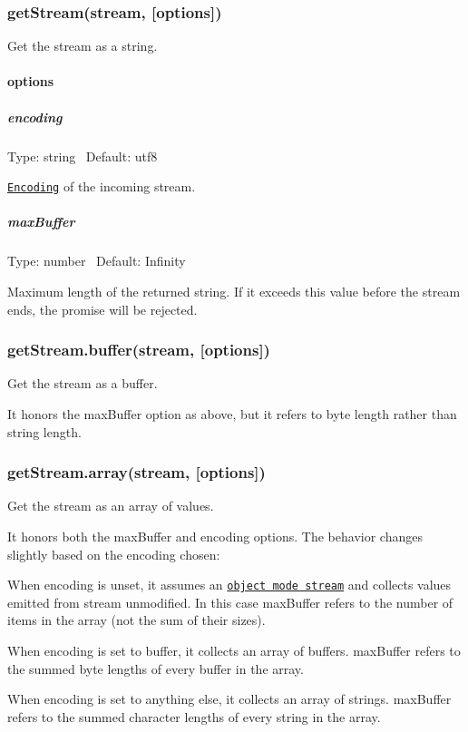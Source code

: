 \subsubsection*{get\+Stream(stream, \mbox{[}options\mbox{]})}

Get the {\ttfamily stream} as a string.

\paragraph*{options}

\subparagraph*{encoding}

Type\+: {\ttfamily string}~\newline
 Default\+: {\ttfamily utf8}

\href{https://nodejs.org/api/buffer.html#buffer_buffer}{\tt Encoding} of the incoming stream.

\subparagraph*{max\+Buffer}

Type\+: {\ttfamily number}~\newline
 Default\+: {\ttfamily Infinity}

Maximum length of the returned string. If it exceeds this value before the stream ends, the promise will be rejected.

\subsubsection*{get\+Stream.\+buffer(stream, \mbox{[}options\mbox{]})}

Get the {\ttfamily stream} as a buffer.

It honors the {\ttfamily max\+Buffer} option as above, but it refers to byte length rather than string length.

\subsubsection*{get\+Stream.\+array(stream, \mbox{[}options\mbox{]})}

Get the {\ttfamily stream} as an array of values.

It honors both the {\ttfamily max\+Buffer} and {\ttfamily encoding} options. The behavior changes slightly based on the encoding chosen\+:


\begin{DoxyItemize}
\item When {\ttfamily encoding} is unset, it assumes an \href{https://nodesource.com/blog/understanding-object-streams/}{\tt object mode stream} and collects values emitted from {\ttfamily stream} unmodified. In this case {\ttfamily max\+Buffer} refers to the number of items in the array (not the sum of their sizes).
\item When {\ttfamily encoding} is set to {\ttfamily buffer}, it collects an array of buffers. {\ttfamily max\+Buffer} refers to the summed byte lengths of every buffer in the array.
\item When {\ttfamily encoding} is set to anything else, it collects an array of strings. {\ttfamily max\+Buffer} refers to the summed character lengths of every string in the array.
\end{DoxyItemize}

